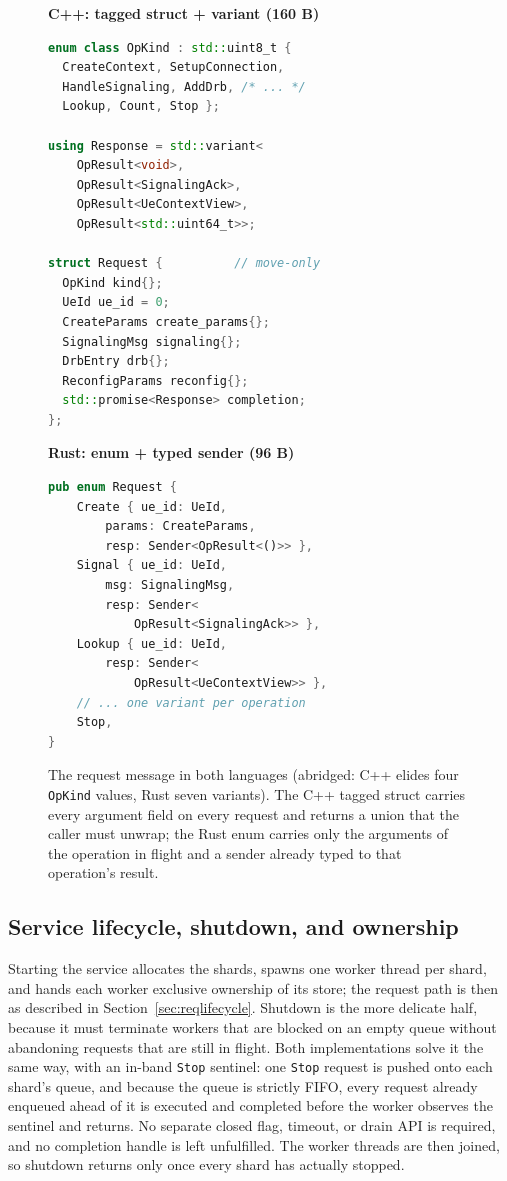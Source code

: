\documentclass[english,twoside,openright,a4paper,censored,csm,software-track-2020]{HYthesisML}
\begin{document}
\begin{figure}
\begin{minipage}[t]{0.50\linewidth}
\textbf{\footnotesize C++: tagged struct + variant (160 B)}
\begin{lstlisting}[language=C++]
enum class OpKind : std::uint8_t {
  CreateContext, SetupConnection,
  HandleSignaling, AddDrb, /* ... */
  Lookup, Count, Stop };

using Response = std::variant<
    OpResult<void>,
    OpResult<SignalingAck>,
    OpResult<UeContextView>,
    OpResult<std::uint64_t>>;

struct Request {          // move-only
  OpKind kind{};
  UeId ue_id = 0;
  CreateParams create_params{};
  SignalingMsg signaling{};
  DrbEntry drb{};
  ReconfigParams reconfig{};
  std::promise<Response> completion;
};
\end{lstlisting}
\end{minipage}\hfill
\begin{minipage}[t]{0.46\linewidth}
\textbf{\footnotesize Rust: enum + typed sender (96 B)}
\begin{lstlisting}[language=Rust]
pub enum Request {
    Create { ue_id: UeId,
        params: CreateParams,
        resp: Sender<OpResult<()>> },
    Signal { ue_id: UeId,
        msg: SignalingMsg,
        resp: Sender<
            OpResult<SignalingAck>> },
    Lookup { ue_id: UeId,
        resp: Sender<
            OpResult<UeContextView>> },
    // ... one variant per operation
    Stop,
}
\end{lstlisting}
\end{minipage}
\caption[The request message in both languages]{The request message in both languages (abridged: C++ elides four \texttt{OpKind}
values, Rust seven variants). The C++ tagged struct carries every argument field on every
request and returns a union that the caller must unwrap; the Rust enum carries only the
arguments of the operation in flight and a sender already typed to that operation's
result.\label{lst:request}}
\end{figure}

\subsection{Service lifecycle, shutdown, and ownership}
Starting the service allocates the shards, spawns one worker thread per shard, and hands each
worker exclusive ownership of its store; the request path is then as described in
Section~\ref{sec:reqlifecycle}. Shutdown is the more delicate half, because it must terminate
workers that are blocked on an empty queue without abandoning requests that are still in
flight. Both implementations solve it the same way, with an in-band \texttt{Stop} sentinel:
one \texttt{Stop} request is pushed onto each shard's queue, and because the queue is strictly
FIFO, every request already enqueued ahead of it is executed and completed before the worker
observes the sentinel and returns. No separate closed flag, timeout, or drain API is required,
and no completion handle is left unfulfilled. The worker threads are then joined, so shutdown
returns only once every shard has actually stopped.
\end{document}
